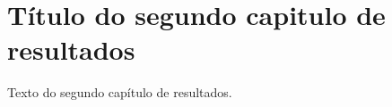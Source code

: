 \chapter{Título do segundo capitulo de resultados}\label{capitulo4}

Texto do segundo capítulo de resultados.